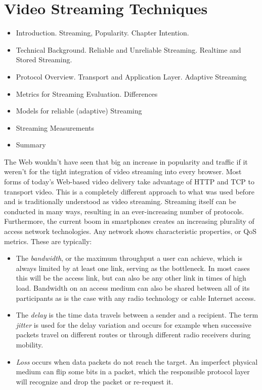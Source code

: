 \chapter{Video Streaming Techniques}
\label{chap:streaming}

\begin{itemize}
\item Introduction. Streaming, Popularity. Chapter Intention.
\item Technical Background. Reliable and Unreliable Streaming. Realtime and Stored Streaming.
\item Protocol Overview. Transport and Application Layer. Adaptive Streaming
\item Metrics for Streaming Evaluation. Differences 
\item Models for reliable (adaptive) Streaming
\item Streaming Measurements
\item Summary
\end{itemize}

The Web wouldn't have seen that big an increase in popularity and traffic if it weren't for the tight integration of video streaming into every browser. Most forms of today's Web-based video delivery take advantage of \gls{HTTP} and \gls{TCP} to transport video. This is a completely different approach to what was used before and is traditionally understood as video streaming. 
Streaming itself can be conducted in many ways, resulting in an ever-increasing number of protocols. Furthermore, the current boom in smartphones creates an increasing plurality of access network technologies.
Any network shows characteristic properties, or \gls{QoS} metrics. These are typically:
\begin{itemize}
\item The \textit{bandwidth}, or the maximum throughput a user can achieve, which is always limited by at least one link, serving as the bottleneck. In most cases this will be the access link, but can also be any other link in times of high load. Bandwidth on an access medium can also be shared between all of its participants as is the case with any radio technology or cable Internet access.
\item The \textit{delay} is the time data travels between a sender and a recipient. The term \textit{jitter} is used  for the delay variation and occurs for example when successive packets travel on different routes or through different radio receivers during mobility.
\item \textit{Loss} occurs when data packets do not reach the target. An imperfect physical medium can flip some bits in a packet, which the responsible protocol layer will recognize and drop the packet or re-request it.
\end{itemize}

